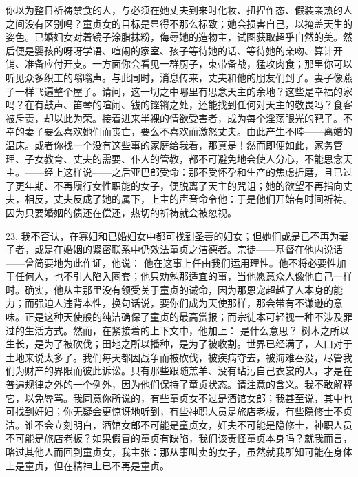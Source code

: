 你以为整日祈祷禁食的人，与必须在她丈夫到来时化妆、扭捏作态、假装亲热的人之间没有区别吗？童贞女的目标是显得不那么标致；她会损害自己，以掩盖天生的姿色。已婚妇女对着镜子涂脂抹粉，侮辱她的造物主，试图获取超乎自然的美。然后便是婴孩的呀呀学语、喧闹的家室、孩子等待她的话、等待她的亲吻、算计开销、准备应付开支。一方面你会看见一群厨子，束带备战，猛攻肉食；那里你可以听见众多织工的嗡嗡声。与此同时，消息传来，丈夫和他的朋友们到了。妻子像燕子一样飞遍整个屋子。请问，这一切之中哪里有思念天主的余地？这些是幸福的家吗？在有鼓声、笛琴的喧闹、钹的铿锵之处，还能找到任何对天主的敬畏吗？食客被斥责，却以此为荣。接着进来半裸的情欲受害者，成为每个淫荡眼光的靶子。不幸的妻子要么喜欢她们而丧亡，要么不喜欢而激怒丈夫。由此产生不睦——离婚的温床。或者你找一个没有这些事的家庭给我看，那真是！然而即便如此，家务管理、子女教育、丈夫的需要、仆人的管教，都不可避免地会使人分心，不能思念天主。——经上这样说——之后亚巴郎受命：那不受怀孕和生产的焦虑折磨，且已过了更年期、不再履行女性职能的女子，便脱离了天主的咒诅；她的欲望不再指向丈夫，相反，丈夫反成了她的属下，上主的声音命令他：于是他们开始有时间祈祷。因为只要婚姻的债还在偿还，热切的祈祷就会被忽视。\par

23. 我不否认，在寡妇和已婚妇女中都可找到圣善的妇女；但她们或是已不再为妻子者，或是在婚姻的紧密联系中仍效法童贞之洁德者。宗徒——基督在他内说话——曾简要地为此作证，他说：  他在这事上任由我们运用理性。他不将必要性加于任何人，也不引人陷入圈套；他只劝勉那适宜的事，当他愿意众人像他自己一样时。确实，他从主那里没有领受关于童贞的诫命，因为那恩宠超越了人本身的能力；而强迫人违背本性，换句话说，要你们成为天使那样，那会带有不谦逊的意味。正是这种天使般的纯洁确保了童贞的最高赏报；而宗徒本可轻视一种不涉及罪过的生活方式。然而，在紧接着的上下文中，他加上：  是什么意思？ 树木之所以生长，是为了被砍伐；田地之所以播种，是为了被收割。世界已经满了，人口对于土地来说太多了。我们每天都因战争而被砍伐，被疾病夺去，被海难吞没，尽管我们为财产的界限而彼此诉讼。只有那些跟随羔羊、没有玷污自己衣裳的人，才是在普遍规律之外的一个例外，因为他们保持了童贞状态。请注意的含义。我不敢解释它，以免辱骂。我同意你所说的，有些童贞女不过是酒馆女郎；我甚至说，其中也可找到奸妇；你无疑会更惊讶地听到，有些神职人员是旅店老板，有些隐修士不贞洁。谁不会立刻明白，酒馆女郎不可能是童贞女，奸夫不可能是隐修士，神职人员不可能是旅店老板？如果假冒的童贞有缺陷，我们该责怪童贞本身吗？就我而言，略过其他人而回到童贞女，我主张：那从事叫卖的女子，虽然就我所知可能在身体上是童贞，但在精神上已不再是童贞。\par

